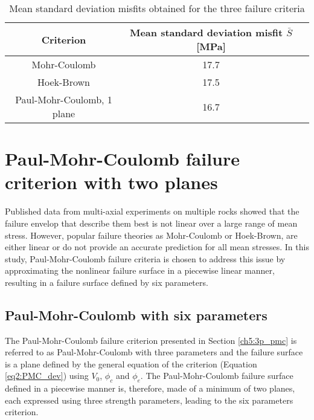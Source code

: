 \begin{table}
    \centering
    \captionsetup{justification=centering}
    \caption{Mean standard deviation misfits obtained for the three failure criteria}
    \begin{tabular}{ccc}
        \hline 
        Criterion & Mean standard deviation misfit $\bar{S}$ [\si{MPa}] \\
        \hline
        \hline
        Mohr-Coulomb & 17.7 \\
        Hoek-Brown & 17.5 \\
        Paul-Mohr-Coulomb, 1 plane & 16.7 \\
        \hline
    \end{tabular}
    \label{tb5:stand_dev}
\end{table}

\section{Paul-Mohr-Coulomb failure criterion with two planes}\label{ch5:PMC}

Published data from multi-axial experiments on multiple rocks showed that the failure envelop that describe them best is not linear over a large range of mean stress. However, popular failure theories as Mohr-Coulomb or Hoek-Brown, are either linear or do not provide an accurate prediction for all mean stresses. In this study, Paul-Mohr-Coulomb failure criteria is chosen to address this issue by approximating the nonlinear failure surface in a piecewise linear manner, resulting in a failure surface defined by six parameters.

\subsection{Paul-Mohr-Coulomb with six parameters}\label{ch5:PMC_theo_6p}

The Paul-Mohr-Coulomb failure criterion presented in Section \ref{ch5:3p_pmc} is referred to as Paul-Mohr-Coulomb with three parameters and the failure surface is a plane defined by the general equation of the criterion (Equation \ref{eq2:PMC_dev}) using $V_0$, $\phi_c$ and $\phi_e$. The Paul-Mohr-Coulomb failure surface defined in a piecewise manner is, therefore, made of a minimum of two planes, each expressed using three strength parameters, leading to the six parameters criterion.

